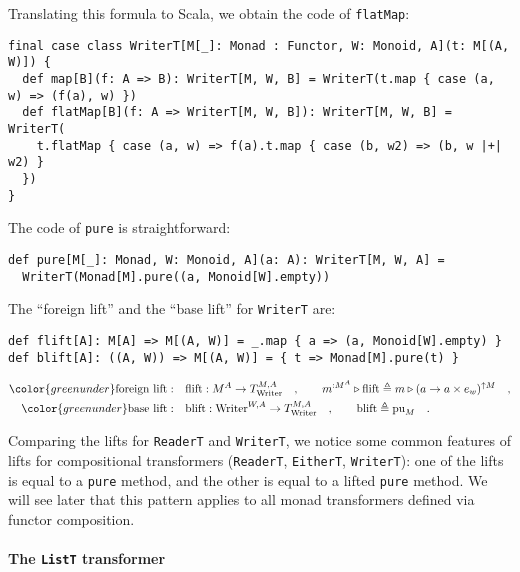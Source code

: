 Translating this formula to Scala, we obtain the code of \lstinline!flatMap!:
\begin{lstlisting}
final case class WriterT[M[_]: Monad : Functor, W: Monoid, A](t: M[(A, W)]) {
  def map[B](f: A => B): WriterT[M, W, B] = WriterT(t.map { case (a, w) => (f(a), w) })
  def flatMap[B](f: A => WriterT[M, W, B]): WriterT[M, W, B] = WriterT(
    t.flatMap { case (a, w) => f(a).t.map { case (b, w2) => (b, w |+| w2) }  
  })
}  
\end{lstlisting}
The code of \lstinline!pure! is straightforward:
\begin{lstlisting}
def pure[M[_]: Monad, W: Monoid, A](a: A): WriterT[M, W, A] =
  WriterT(Monad[M].pure((a, Monoid[W].empty))
\end{lstlisting}
The \textsf{``}foreign lift\textsf{''} and the \textsf{``}base lift\textsf{''} for \lstinline!WriterT!
are:
\begin{lstlisting}
def flift[A]: M[A] => M[(A, W)] = _.map { a => (a, Monoid[W].empty) }
def blift[A]: ((A, W)) => M[(A, W)] = { t => Monad[M].pure(t) }
\end{lstlisting}
\begin{align*}
{\color{greenunder}\text{foreign lift}:}\quad & \text{flift}:M^{A}\rightarrow T_{\text{Writer}}^{M,A}\quad,\quad\quad m^{:M^{A}}\triangleright\text{flift}\triangleq m\triangleright(a\rightarrow a\times e_{w})^{\uparrow M}\quad,\\
{\color{greenunder}\text{base lift}:}\quad & \text{blift}:\text{Writer}^{W,A}\rightarrow T_{\text{Writer}}^{M,A}\quad,\quad\quad\text{blift}\triangleq\text{pu}_{M}\quad.
\end{align*}

Comparing the lifts for \lstinline!ReaderT! and \lstinline!WriterT!,
we notice some common features of lifts for compositional transformers
(\lstinline!ReaderT!, \lstinline!EitherT!, \lstinline!WriterT!):
one of the lifts is equal to a \lstinline!pure! method, and the other
is equal to a lifted \lstinline!pure! method. We will see later that
this pattern applies to all monad transformers defined via functor
composition.

\paragraph{The \texttt{ListT} transformer}

